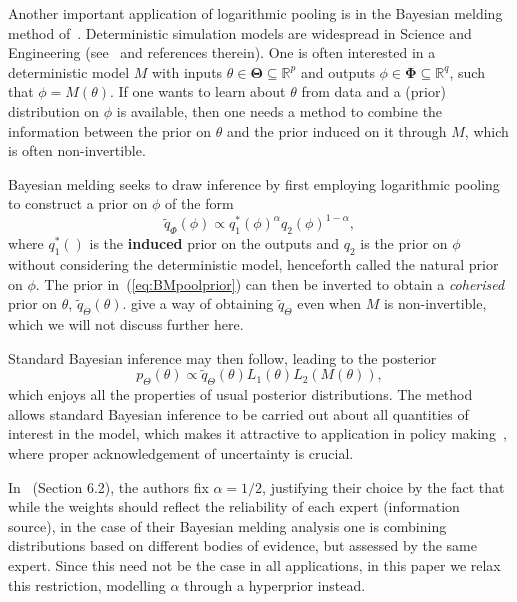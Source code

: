 \documentclass[a4paper, notitlepage, 10pt]{article}
\begin{document}
Another important application of logarithmic pooling is in the Bayesian melding method of~\cite{Poole2000}.
Deterministic simulation models are widespread in Science and Engineering (see~\cite{Poole2000} and references therein).
One is often interested in a deterministic model $M$ with inputs $\theta \in \boldsymbol\Theta \subseteq \mathbb{R}^p$ and outputs $\phi \in \boldsymbol\Phi\subseteq \mathbb{R}^q$, such that $\phi = M(\theta)$.
If one wants to learn about $\theta$ from data and a (prior) distribution on $\phi$ is available, then one needs a method to combine the information between the prior on $\theta$ and the prior induced on it  through $M$, which is often non-invertible.

Bayesian melding seeks to draw inference by first employing logarithmic pooling to construct a prior on $\phi$ of the form
\begin{equation}
 \label{eq:BMpoolprior}
 \tilde{q}_{\Phi}(\phi) \propto q_1^\ast(\phi)^\alpha q_2(\phi)^{1-\alpha},
\end{equation}
where $q_1^\ast()$ is the \textbf{induced} prior on the outputs and $q_2$ is the prior on $\phi$ without considering the deterministic model, henceforth called the natural prior on $\phi$.
The prior in~(\ref{eq:BMpoolprior}) can then be inverted to obtain a \textit{coherised} prior on $\theta$, $\tilde{q}_{\Theta}(\theta)$.
\cite{Poole2000} give  a way of obtaining $\tilde{q}_{\Theta}$ even when $M$ is non-invertible, which we will not discuss further here. 

Standard Bayesian inference may then follow,  leading to the posterior
\begin{equation}
 \label{eq:BMpoolposterior}
 p_{\Theta}(\theta) \propto \tilde{q}_{\Theta}(\theta) L_1(\theta) L_2(M(\theta)),
\end{equation}
which enjoys all the properties of usual posterior distributions.
The method allows standard Bayesian inference to be carried out about all quantities of interest in the model, which makes it attractive to application in policy making~\citep{Alkema2008}, where proper acknowledgement of uncertainty is crucial.

In~\cite{Poole2000} (Section 6.2), the authors fix $\alpha = 1/2$, justifying their choice by the fact that while the weights should reflect the reliability of each expert (information source), in the case of their Bayesian melding analysis one is combining distributions based on different bodies of evidence, but assessed by the same expert.
Since this need not be the case in all applications, in this paper we relax this restriction, modelling $\alpha$ through a hyperprior instead. 
\end{document}
